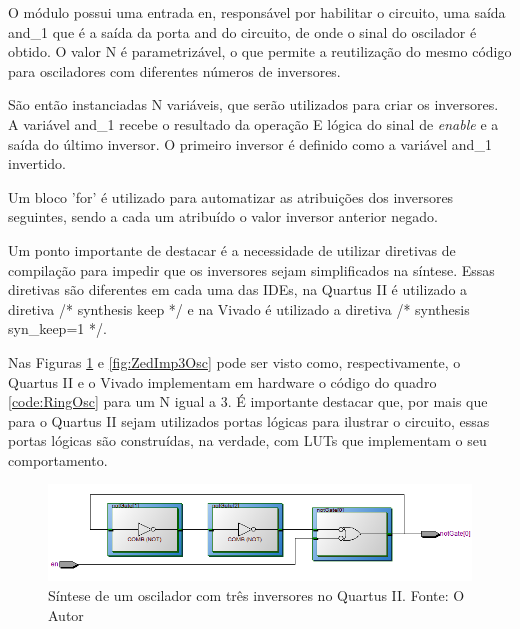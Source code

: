O módulo possui uma entrada en, responsável por habilitar o circuito, uma saída and\_1 que é a saída da porta and do circuito, de onde o sinal do oscilador é obtido. O valor N é parametrizável, o que permite a reutilização do mesmo código para osciladores com diferentes números de inversores.

São então instanciadas N variáveis, que serão utilizados para criar os inversores. A variável and\_1 recebe o resultado da operação E lógica do sinal de \textit{enable} e a saída do último inversor. O primeiro inversor é definido como a variável and\_1 invertido.

Um bloco 'for' é utilizado para automatizar as atribuições dos inversores seguintes, sendo a cada um atribuído o valor inversor anterior negado.

Um ponto importante de destacar é a necessidade de utilizar diretivas de compilação para impedir que os inversores sejam simplificados na síntese. Essas diretivas são diferentes em cada uma das IDEs, na Quartus II é utilizado a diretiva /* synthesis keep */ e na Vivado é utilizado a diretiva /* synthesis syn\_keep=1 */.


Nas Figuras \ref{fig:DE2Imp3Osc} e \ref{fig:ZedImp3Osc} pode ser visto como, respectivamente, o Quartus II e o Vivado implementam em hardware o código do quadro \ref{code:RingOsc} para um N igual a 3. É importante destacar que, por mais que para o Quartus II sejam utilizados portas lógicas para ilustrar o circuito, essas portas lógicas são construídas, na verdade, com LUTs que implementam o seu comportamento.

\begin{figure}[H]
    \centering
    \includegraphics[width=\linewidth]{figures/Metodologia/DE2_Implementation_3Inverter_Gates.png}
    \caption{Síntese de um oscilador com três inversores no Quartus II. Fonte: O Autor}
    \label{fig:DE2Imp3Osc}
\end{figure}

